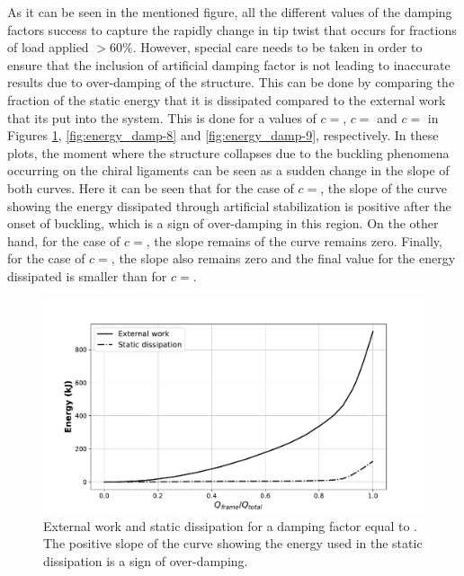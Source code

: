     As it can be seen in the mentioned figure, all the different values of the damping factors success to capture the rapidly change in tip twist that occurs for fractions of load applied $>60\%$. However, special care needs to be taken in order to ensure that the inclusion of artificial damping factor is not leading to inaccurate results due to over-damping of the structure. This can be done by comparing the fraction of the static energy that it is dissipated compared to the external work that its put into the system. This is done for a values of $c =$, $c =$ and $c =$ in Figures \ref{fig:energy_damp-5}, \ref{fig:energy_damp-8} and \ref{fig:energy_damp-9}, respectively. In these plots, the moment where the structure collapses due to the buckling phenomena occurring on the chiral ligaments can be seen as a sudden change in the slope of both curves. Here it can be seen that for the case of $c =$, the slope of the curve showing the energy dissipated through artificial stabilization is positive after the onset of buckling, which is a sign of over-damping in this region. On the other hand, for the case of $c =$, the slope remains of the curve remains zero. Finally, for the case of $c =$, the slope also remains zero and the final value for the energy dissipated is smaller than for $c =$.

    \begin{figure}[!htpb]
      \centering
      \includegraphics[width=0.8 \textwidth]{../figures/result-model/energy_damp-5}
      \caption[External work and static dissipation for a damping factor equal to ]{External work and static dissipation for a damping factor equal to . The positive slope of the curve showing the energy used in the static dissipation is a sign of over-damping.}\label{fig:energy_damp-5}
    \end{figure}

